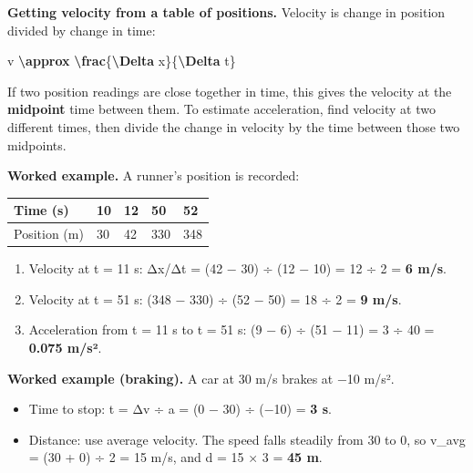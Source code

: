 \documentclass[
]{article}
\newenvironment{Shaded}{\begin{snugshade}}{\end{snugshade}}
\newcommand{\FunctionTok}[1]{\textcolor[rgb]{0.13,0.29,0.53}{\textbf{#1}}}
\newcommand{\NormalTok}[1]{#1}
\newcounter{none} %
\providecommand{\tightlist}{%
  \setlength{\itemsep}{0pt}\setlength{\parskip}{0pt}}
\begin{document}
\textbf{Getting velocity from a table of positions.} Velocity is change
in position divided by change in time:

\begin{Shaded}
\begin{Highlighting}[]
\NormalTok{v }\FunctionTok{\textbackslash{}approx} \FunctionTok{\textbackslash{}frac}\NormalTok{\{}\FunctionTok{\textbackslash{}Delta}\NormalTok{ x\}\{}\FunctionTok{\textbackslash{}Delta}\NormalTok{ t\}}
\end{Highlighting}
\end{Shaded}

If two position readings are close together in time, this gives the
velocity at the \textbf{midpoint} time between them. To estimate
acceleration, find velocity at two different times, then divide the
change in velocity by the time between those two midpoints.

\textbf{Worked example.} A runner's position is recorded:

{\def\LTcaptype{none} %
\begin{longtable}[]{@{}lllll@{}}
\toprule\noalign{}
Time (s) & 10 & 12 & 50 & 52 \\
\midrule\noalign{}
\endhead
\bottomrule\noalign{}
\endlastfoot
Position (m) & 30 & 42 & 330 & 348 \\
\end{longtable}
}

\begin{enumerate}
\def\labelenumi{\arabic{enumi}.}
\tightlist
\item
  Velocity at t = 11 s: Δx/Δt = (42 − 30) ÷ (12 − 10) = 12 ÷ 2 =
  \textbf{6 m/s}.
\item
  Velocity at t = 51 s: (348 − 330) ÷ (52 − 50) = 18 ÷ 2 = \textbf{9
  m/s}.
\item
  Acceleration from t = 11 s to t = 51 s: (9 − 6) ÷ (51 − 11) = 3 ÷ 40 =
  \textbf{0.075 m/s²}.
\end{enumerate}

\textbf{Worked example (braking).} A car at 30 m/s brakes at −10 m/s².

\begin{itemize}
\tightlist
\item
  Time to stop: t = Δv ÷ a = (0 − 30) ÷ (−10) = \textbf{3 s}.
\item
  Distance: use average velocity. The speed falls steadily from 30 to 0,
  so v\_avg = (30 + 0) ÷ 2 = 15 m/s, and d = 15 × 3 = \textbf{45 m}.
\end{itemize}
\end{document}
